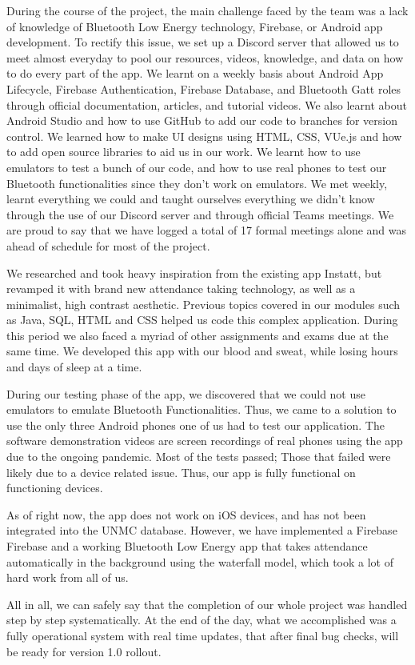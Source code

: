 \documentclass[../report.pdf]{subfiles}
\begin{document}
During the course of the project, the main challenge faced by the team was a lack of knowledge of Bluetooth Low Energy technology, Firebase, or Android app development. To rectify this issue, we set up a Discord server that allowed us to meet almost everyday to pool our resources, videos, knowledge, and data on how to do every part of the app. We learnt on a weekly basis about Android App Lifecycle, Firebase Authentication, Firebase Database, and Bluetooth Gatt roles through official documentation, articles, and tutorial videos. We also learnt about Android Studio and how to use GitHub to add our code to branches for version control. We learned how to make UI designs using HTML, CSS, VUe.js and how to add open source libraries to aid us in our work. We learnt how to use emulators to test a bunch of our code, and how to use real phones to test our Bluetooth functionalities since they don’t work on emulators. We met weekly, learnt everything we could and taught ourselves everything we didn't know through the use of our Discord server and through official Teams meetings. We are proud to say that we have logged a total of 17 formal meetings alone and was ahead of schedule for most of the project.

We researched and took heavy inspiration from the existing app Instatt, but revamped it with brand new attendance taking technology, as well as a minimalist, high contrast aesthetic. Previous topics covered in our modules such as Java, SQL, HTML and CSS helped us code this complex application. During this period we also faced a myriad of other assignments and exams due at the same time. We developed this app with our blood and sweat, while losing hours and days of sleep at a time. 

During our testing phase of the app, we discovered that we could not use emulators to emulate Bluetooth Functionalities. Thus, we came to a solution to use the only three Android phones one of us had to test our application. The software demonstration videos are screen recordings of real phones using the app due to the ongoing pandemic. Most of the tests passed; Those that failed were likely due to a device related issue. Thus, our app is fully functional on functioning devices.

As of right now, the app does not work on iOS devices, and has not been integrated into the UNMC database. However, we have implemented a Firebase Firebase and a working Bluetooth Low Energy app that takes attendance automatically in the background using the waterfall model, which took a lot of hard work from all of us. 

All in all, we can safely say that the completion of our whole project was handled step by step systematically. At the end of the day, what we accomplished was a fully operational system with real time updates, that after final bug checks, will be ready for version 1.0 rollout.
\end{document}
